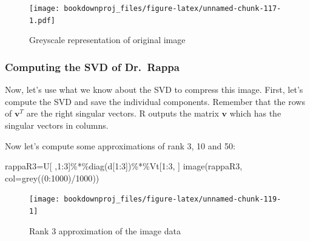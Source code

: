 \documentclass[
]{article}
\newenvironment{Shaded}{\begin{snugshade}}{\end{snugshade}}
\newcommand{\AttributeTok}[1]{\textcolor[rgb]{0.77,0.63,0.00}{#1}}
\newcommand{\DecValTok}[1]{\textcolor[rgb]{0.00,0.00,0.81}{#1}}
\newcommand{\FunctionTok}[1]{\textcolor[rgb]{0.00,0.00,0.00}{#1}}
\newcommand{\NormalTok}[1]{#1}
\newcommand{\OtherTok}[1]{\textcolor[rgb]{0.56,0.35,0.01}{#1}}
\newcommand{\SpecialCharTok}[1]{\textcolor[rgb]{0.00,0.00,0.00}{#1}}
\theoremstyle{definition}
\theoremstyle{definition}
\theoremstyle{definition}
\theoremstyle{definition}
\theoremstyle{remark}
\begin{document}
\begin{figure}
\centering
\texttt{[image: bookdownproj\_files/figure-latex/unnamed-chunk-117-1.pdf]}
\caption{\label{fig:unnamed-chunk-117}Greyscale representation of original image}
\end{figure}

\hypertarget{computing-the-svd-of-dr.-rappa}{%
\subsubsection{Computing the SVD of Dr.~Rappa}\label{computing-the-svd-of-dr.-rappa}}

Now, let's use what we know about the SVD to compress this image. First, let's compute the SVD and save the individual components. Remember that the rows of \(\mathbf{v}^T\) are the right singular vectors. R outputs the matrix \(\mathbf{v}\) which has the singular vectors in columns.

\begin{Shaded}
\end{Shaded}

Now let's compute some approximations of rank 3, 10 and 50:

\begin{Shaded}
\begin{Highlighting}[]
\NormalTok{rappaR3}\OtherTok{=}\NormalTok{U[ ,}\DecValTok{1}\SpecialCharTok{:}\DecValTok{3}\NormalTok{]}\SpecialCharTok{\%*\%}\FunctionTok{diag}\NormalTok{(d[}\DecValTok{1}\SpecialCharTok{:}\DecValTok{3}\NormalTok{])}\SpecialCharTok{\%*\%}\NormalTok{Vt[}\DecValTok{1}\SpecialCharTok{:}\DecValTok{3}\NormalTok{, ]}
\FunctionTok{image}\NormalTok{(rappaR3, }\AttributeTok{col=}\FunctionTok{grey}\NormalTok{((}\DecValTok{0}\SpecialCharTok{:}\DecValTok{1000}\NormalTok{)}\SpecialCharTok{/}\DecValTok{1000}\NormalTok{))}
\end{Highlighting}
\end{Shaded}

\begin{figure}

{\centering \texttt{[image: bookdownproj\_files/figure-latex/unnamed-chunk-119-1]} 

}

\caption{Rank 3 approximation of the image data}\label{fig:unnamed-chunk-119}
\end{figure}
\end{document}
